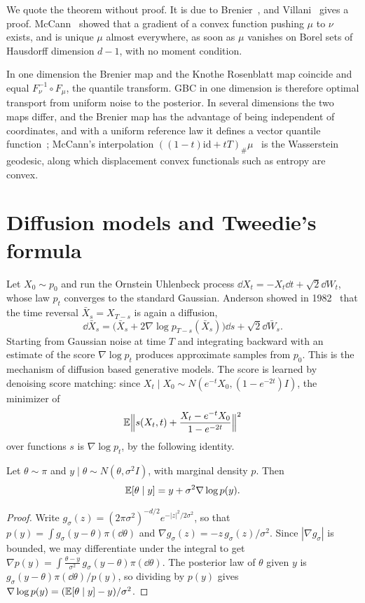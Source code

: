We quote the theorem without proof. It is due to Brenier~\cite{brenier1991}, and Villani~\cite[Chapter~2]{villani2003} gives a proof. McCann~\cite{mccann1995} showed that a gradient of a convex function pushing $\mu$ to $\nu$ exists, and is unique $\mu$ almost everywhere, as soon as $\mu$ vanishes on Borel sets of Hausdorff dimension $d-1$, with no moment condition.

In one dimension the Brenier map and the Knothe Rosenblatt map coincide and equal $F_\nu^{-1}\circ F_\mu$, the quantile transform. GBC in one dimension is therefore optimal transport from uniform noise to the posterior. In several dimensions the two maps differ, and the Brenier map has the advantage of being independent of coordinates, and with a uniform reference law it defines a vector quantile function~\cite{carlier2016}; McCann's interpolation $((1-t)\mathrm{id}+tT)_\#\mu$~\cite{mccann1997} is the Wasserstein geodesic, along which displacement convex functionals such as entropy are convex.

\section{Diffusion models and Tweedie's formula}

Let $X_0\sim p_0$ and run the Ornstein Uhlenbeck process $\dd X_t = -X_t\dd t+\sqrt2\dd W_t$, whose law $p_t$ converges to the standard Gaussian. Anderson showed in 1982~\cite{anderson1982} that the time reversal $\bar X_s = X_{T-s}$ is again a diffusion,
\[
\dd\bar X_s = \big(\bar X_s+2\nabla\log p_{T-s}(\bar X_s)\big)\dd s+\sqrt2\dd\bar W_s.
\]
Starting from Gaussian noise at time $T$ and integrating backward with an estimate of the score $\nabla\log p_t$ produces approximate samples from $p_0$. This is the mechanism of diffusion based generative models. The score is learned by denoising score matching: since $X_t\mid X_0\sim N(e^{-t}X_0,(1-e^{-2t})I)$, the minimizer of
\[
\mathbb{E}\Big\|s(X_t,t)+\frac{X_t-e^{-t}X_0}{1-e^{-2t}}\Big\|^2
\]
over functions $s$ is $\nabla\log p_t$, by the following identity.

\begin{theorem}
\label{thm:tweedie}
Let $\theta\sim\pi$ and $y\mid\theta\sim N(\theta,\sigma^2I)$, with marginal density $p$. Then
\[
\mathbb{E}[\theta\mid y] = y+\sigma^2\nabla\log p(y).
\]
\end{theorem}

\begin{proof}
Write $g_\sigma(z) = (2\pi\sigma^2)^{-d/2}e^{-|z|^2/2\sigma^2}$, so that $p(y) = \int g_\sigma(y-\theta)\pi(\dd\theta)$ and $\nabla g_\sigma(z) = -z\,g_\sigma(z)/\sigma^2$. Since $|\nabla g_\sigma|$ is bounded, we may differentiate under the integral to get $\nabla p(y) = \int\frac{\theta-y}{\sigma^2}\,g_\sigma(y-\theta)\pi(\dd\theta)$. The posterior law of $\theta$ given $y$ is $g_\sigma(y-\theta)\pi(\dd\theta)/p(y)$, so dividing by $p(y)$ gives $\nabla\log p(y) = (\mathbb{E}[\theta\mid y]-y)/\sigma^2$.
\end{proof}

